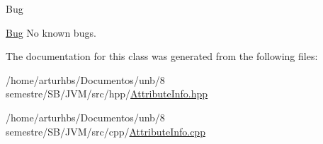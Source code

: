 \begin{DoxyRefDesc}{Bug}
\item[\hyperlink{bug__bug000007}{Bug}]No known bugs. \end{DoxyRefDesc}


The documentation for this class was generated from the following files\+:\begin{DoxyCompactItemize}
\item 
/home/arturhbs/\+Documentos/unb/8 semestre/\+S\+B/\+J\+V\+M/src/hpp/\hyperlink{AttributeInfo_8hpp}{Attribute\+Info.\+hpp}\item 
/home/arturhbs/\+Documentos/unb/8 semestre/\+S\+B/\+J\+V\+M/src/cpp/\hyperlink{AttributeInfo_8cpp}{Attribute\+Info.\+cpp}\end{DoxyCompactItemize}

